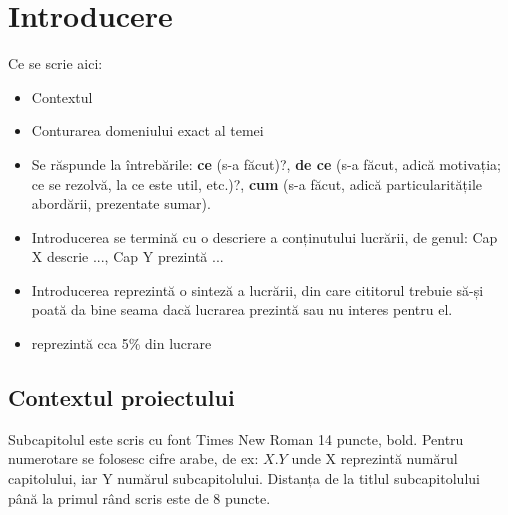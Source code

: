 
\chapter{Introducere}
\label{cap:Introducere}
\pagestyle{headings}
Ce se scrie aici:
\begin{itemize}
    \item Contextul
    \item Conturarea domeniului exact al temei
    \item Se răspunde la întrebările: \textbf{ce} (s-a făcut)?, \textbf{de ce} (s-a făcut, adică motivația; ce se rezolvă, la ce este util, etc.)?, \textbf{cum} (s-a făcut, adică particularitățile abordării, prezentate sumar).
    \item Introducerea se termină cu o descriere a conținutului lucrării, de genul: Cap X descrie ..., Cap Y prezintă ...
    \item Introducerea reprezintă o sinteză a lucrării, din care cititorul trebuie să-și poată da bine seama dacă lucrarea prezintă sau nu interes pentru el. 
\item reprezintă cca 5\% din lucrare
\end{itemize}

\section{Contextul proiectului}
Subcapitolul este scris cu font Times New Roman 14 puncte, bold. Pentru numerotare se folosesc cifre arabe, de ex: $X.Y$ unde X reprezintă numărul capitolului, iar Y numărul subcapitolului. Distanța de la titlul subcapitolului până la primul rând scris este de 8 puncte.

